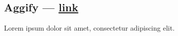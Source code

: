 \subsection{{Aggify --- \href{https://github.com/Aggify/aggify}{link}}}
\begin{zitemize}
\item Lorem ipsum dolor sit amet, consectetur adipiscing elit.
\end{zitemize}
